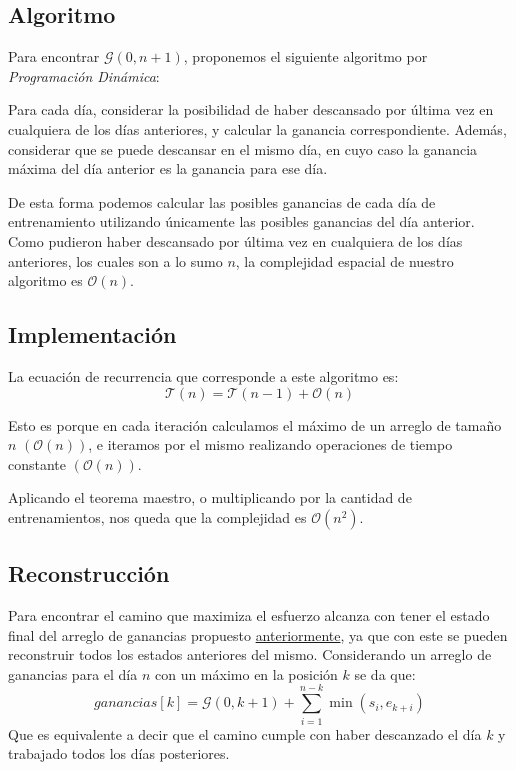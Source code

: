 \subsection{Algoritmo}

Para encontrar $\mathcal{G} \left( 0, n + 1 \right)$, proponemos el siguiente
algoritmo por \textit{Programaci\'on Din\'amica}:

Para cada d\'ia, considerar la posibilidad de haber descansado por \'ultima
vez en cualquiera de los d\'ias anteriores, y calcular la ganancia
correspondiente. Adem\'as, considerar que se puede descansar en el mismo d\'ia,
en cuyo caso la ganancia m\'axima del d\'ia anterior es la ganancia para ese
d\'ia.

De esta forma podemos calcular las posibles ganancias de cada d\'ia de
entrenamiento utilizando \'unicamente las posibles ganancias del d\'ia
anterior. Como pudieron haber descansado por \'ultima vez en cualquiera de los
d\'ias anteriores, los cuales son a lo sumo $n$, la complejidad espacial de
nuestro algoritmo es $\mathcal{O}(n)$.

\subsection{Implementaci\'on}
\label{sec:implementacion}



La ecuaci\'on de recurrencia que corresponde a este algoritmo es:
\begin{equation*}
    \mathcal{T}(n) = \mathcal{T}\left(n - 1\right) + \mathcal{O}\left(n\right)
\end{equation*}

Esto es porque en cada iteraci\'on calculamos el m\'aximo de un arreglo de
tama\~no $n$ $\left( \mathcal{O}(n) \right)$, e iteramos por el mismo
realizando operaciones de tiempo constante $\left( \mathcal{O}(n) \right)$.

Aplicando el teorema maestro, o multiplicando por la cantidad de
entrenamientos, nos queda que la complejidad es $\mathcal{O}(n^2)$.
 
\subsection{Reconstrucci\'on}

Para encontrar el camino que maximiza el esfuerzo alcanza con tener el estado final
del arreglo de ganancias propuesto \hyperref[sec:implementacion]{anteriormente},
ya que con este se pueden reconstruir todos los estados anteriores del mismo.
Considerando un arreglo de ganancias para el día $n$ con un máximo en la
posici\'on $k$ se da que:
\begin{equation*}
    ganancias[k] = \mathcal{G} ( 0, k + 1 ) + \sum_{i=1}^{n-k} \min (s_i, e_{k+i})
\end{equation*}
    Que es equivalente a decir que el camino cumple con haber descanzado el día
$k$ y trabajado todos los días posteriores.\\

